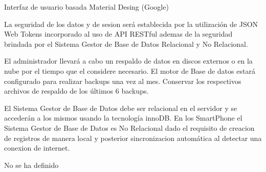          Interfaz de usuario basada Material Desing (Google)
        
         La seguridad de los datos y de sesion será establecida por la utilización de JSON Web Tokens incorporado al uso de API RESTful ademas de la seguridad brindada por el Sistema Gestor de Base de Datos Relacional y No Relacional.

        
        El administrador llevará a cabo un respaldo de datos en discos externos o en la nube por el tiempo que el considere necesario. El motor de Base de datos estará configurado para realizar backups una vez al mes. Conservar los
        respectivos archivos de respaldo de los últimos 6 backups.
        
        
        El Sistema Gestor de Base de Datos debe ser relacional en el servidor y se accederán a los mismos usando la tecnología innoDB.
        En los SmartPhone el Sistema Gestor de Base de Datos es No Relacional dado el requisito de creacion de registros de manera local y posterior sincronizacion automática al detectar una conexion de internet. 
        
        
        No se ha definido
        

\setcounter{secnumdepth}{-1}